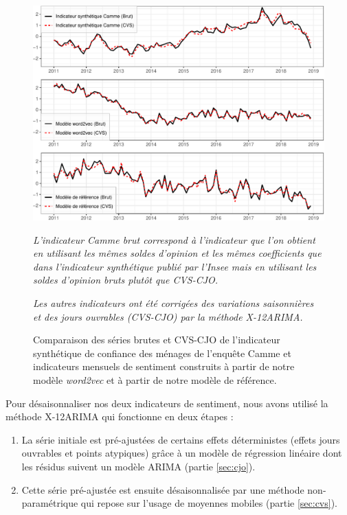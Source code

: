 \documentclass[11pt,french,french]{article}
\begin{document}
\begin{figure}[htp]
{\centering\includegraphics[width = \textwidth]{img/rmd-graphCVS-1}}
\captionsetup{margin=0cm,format=hang,justification=justified}
\caption{Comparaison des séries brutes et CVS-CJO de l'indicateur synthétique de confiance des ménages de l'enquête Camme et indicateurs mensuels de sentiment construits à partir de notre modèle \emph{word2vec} et à partir de notre modèle de référence.}\label{fig:cvscjo}
\footnotesize

\emph{L'indicateur Camme brut correspond à l'indicateur que l'on obtient en utilisant les mêmes soldes d'opinion et les mêmes coefficients que dans l'indicateur synthétique publié par l'Insee mais en utilisant les soldes d'opinion bruts plutôt que CVS-CJO.}

\emph{Les autres indicateurs ont été corrigées des variations saisonnières et des jours ouvrables (CVS-CJO) par la méthode X-12ARIMA.}
\end{figure}

Pour désaisonnaliser nos deux indicateurs de sentiment, nous avons utilisé la méthode X-12ARIMA qui fonctionne en deux étapes :

\begin{enumerate}
\def\labelenumi{\arabic{enumi}.}
\item
  La série initiale est pré-ajustées de certains effets déterministes (effets jours ouvrables et points atypiques) grâce à un modèle de régression linéaire dont les résidus suivent un modèle ARIMA (partie \ref{sec:cjo}).
\item
  Cette série pré-ajustée est ensuite désaisonnalisée par une méthode non-paramétrique qui repose sur l'usage de moyennes mobiles (partie \ref{sec:cvs}).
\end{enumerate}
\end{document}
